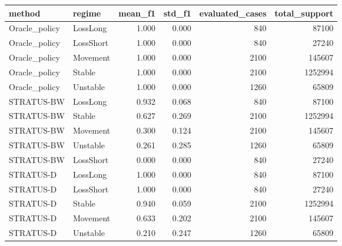 \begin{tabular}{llrrrr}
\toprule
method & regime & mean_f1 & std_f1 & evaluated_cases & total_support \\
\midrule
Oracle_policy & LossLong & 1.000 & 0.000 & 840 & 87100 \\
Oracle_policy & LossShort & 1.000 & 0.000 & 840 & 27240 \\
Oracle_policy & Movement & 1.000 & 0.000 & 2100 & 145607 \\
Oracle_policy & Stable & 1.000 & 0.000 & 2100 & 1252994 \\
Oracle_policy & Unstable & 1.000 & 0.000 & 1260 & 65809 \\
STRATUS-BW & LossLong & 0.932 & 0.068 & 840 & 87100 \\
STRATUS-BW & Stable & 0.627 & 0.269 & 2100 & 1252994 \\
STRATUS-BW & Movement & 0.300 & 0.124 & 2100 & 145607 \\
STRATUS-BW & Unstable & 0.261 & 0.285 & 1260 & 65809 \\
STRATUS-BW & LossShort & 0.000 & 0.000 & 840 & 27240 \\
STRATUS-D & LossLong & 1.000 & 0.000 & 840 & 87100 \\
STRATUS-D & LossShort & 1.000 & 0.000 & 840 & 27240 \\
STRATUS-D & Stable & 0.940 & 0.059 & 2100 & 1252994 \\
STRATUS-D & Movement & 0.633 & 0.202 & 2100 & 145607 \\
STRATUS-D & Unstable & 0.210 & 0.247 & 1260 & 65809 \\
\bottomrule
\end{tabular}
